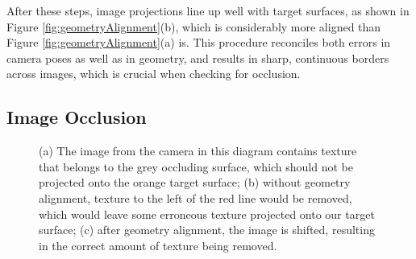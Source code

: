 \documentclass[]{spie}  %
\begin{document}
After these steps, image projections line up well with
target surfaces, as shown in Figure \ref{fig:geometryAlignment}(b),
which is considerably more aligned than Figure
\ref{fig:geometryAlignment}(a) is. This procedure reconciles both
errors in camera poses as well as in geometry, and results in sharp,
continuous borders across images, which is crucial when checking for
occlusion.


\subsection{Image Occlusion}
\label{sec:imageOcclusion}

\begin{figure}
  \centering
  \hspace{0.4cm} 
  \caption{(a) The image from the camera in this diagram contains
    texture that belongs to the grey occluding surface, which should
    not be projected onto the orange target surface; (b) without
    geometry alignment, texture to the left of the red line would be
    removed, which would leave some erroneous texture projected onto
    our target surface; (c) after geometry alignment, the image is
    shifted, resulting in the correct amount of texture being
    removed.}
  \label{fig:occlusion}
\end{figure}
\end{document}
